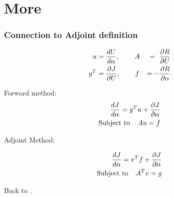 \documentclass{beamer}
\begin{document}
\section{More}
\begin{frame}[label=supplemental]
\frametitle{Connection to Adjoint definition} 

\begin{equation}
    \begin{aligned}
  u&= \frac{d U}{d \alpha}, \hspace{.3 in} A&=\ \frac{\partial R}{\partial U} 
 \\ g^T&= \frac{\partial J}{\partial U},  \hspace{.3 in} f&=-\frac{\partial R}{\partial \alpha}
 \end{aligned}
   \end{equation}

   Forward method:
   \begin{equation}
   \label{disadj1}
      \begin{aligned}
  \frac{dJ}{d \alpha} = g^T u + \frac{\partial J}{\partial \alpha} \\
   \text{Subject to} \hspace{.15 in} Au = f
     \end{aligned}
  \end{equation}

  Adjoint Method:
  
  \begin{equation}
   \label{disadj2}
      \begin{aligned}
  \frac{dJ}{d \alpha} = v^T f + \frac{\partial J}{\partial \alpha} \\
   \text{Subject to} \hspace{.15 in} A^T v = g
     \end{aligned}
 \end{equation}

Back to \hyperlink{main}{}.
\end{frame}
%
%
%
\end{document}
